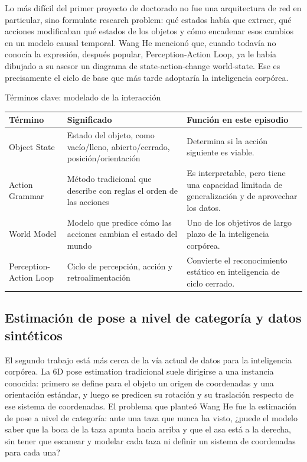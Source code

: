 \documentclass[a4paper]{article}
\begin{document}
Lo más difícil del primer proyecto de doctorado no fue una arquitectura de red en particular, sino formulate research problem: qué estados había que extraer, qué acciones modificaban qué estados de los objetos y cómo encadenar esos cambios en un modelo causal temporal. Wang He mencionó que, cuando todavía no conocía la expresión, después popular, Perception-Action Loop, ya le había dibujado a su asesor un diagrama de state-action-change world-state. Ese es precisamente el ciclo de base que más tarde adoptaría la inteligencia corpórea.

\begin{knowledgebox}{Términos clave: modelado de la interacción}
\begin{tabularx}{\textwidth}{p{}p{}X}
\toprule
Término & Significado & Función en este episodio \\
\midrule
Object State & Estado del objeto, como vacío/lleno, abierto/cerrado, posición/orientación & Determina si la acción siguiente es viable. \\
Action Grammar & Método tradicional que describe con reglas el orden de las acciones & Es interpretable, pero tiene una capacidad limitada de generalización y de aprovechar los datos. \\
World Model & Modelo que predice cómo las acciones cambian el estado del mundo & Uno de los objetivos de largo plazo de la inteligencia corpórea. \\
Perception-Action Loop & Ciclo de percepción, acción y retroalimentación & Convierte el reconocimiento estático en inteligencia de ciclo cerrado. \\
\bottomrule
\end{tabularx}
\end{knowledgebox}

\subsection{Estimación de pose a nivel de categoría y datos sintéticos}

El segundo trabajo está más cerca de la vía actual de datos para la inteligencia corpórea. La 6D pose estimation tradicional suele dirigirse a una instancia conocida: primero se define para el objeto un origen de coordenadas y una orientación estándar, y luego se predicen su rotación y su traslación respecto de ese sistema de coordenadas. El problema que planteó Wang He fue la estimación de pose a nivel de categoría: ante una taza que nunca ha visto, ¿puede el modelo saber que la boca de la taza apunta hacia arriba y que el asa está a la derecha, sin tener que escanear y modelar cada taza ni definir un sistema de coordenadas para cada una?
\end{document}
